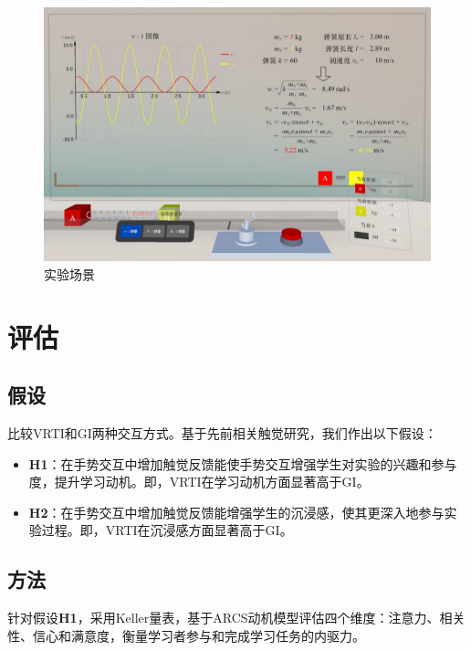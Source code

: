 \documentclass[runningheads]{llncs}
\begin{document}
\begin{figure}[t]
  \centering
  \includegraphics[width=1\textwidth]{image/experiment-scenario.pdf}
  \caption{实验场景}
  \label{fig:experiment-scenario}
\end{figure}


\section{评估}
\subsection{假设}
比较VRTI和GI两种交互方式。基于先前相关触觉研究，我们作出以下假设：

\begin{itemize}[label=$\bullet$]
  \item {\textbf{H1}}：在手势交互中增加触觉反馈能使手势交互增强学生对实验的兴趣和参与度，提升学习动机。即，VRTI在学习动机方面显著高于GI。
  \item {\textbf{H2}}：在手势交互中增加触觉反馈能增强学生的沉浸感，使其更深入地参与实验过程。即，VRTI在沉浸感方面显著高于GI。
\end{itemize}

\subsection{方法}
针对假设\textbf{H1}，采用Keller量表\cite{keller1983motivational}，基于ARCS动机模型评估四个维度：注意力、相关性、信心和满意度，衡量学习者参与和完成学习任务的内驱力。
\end{document}
